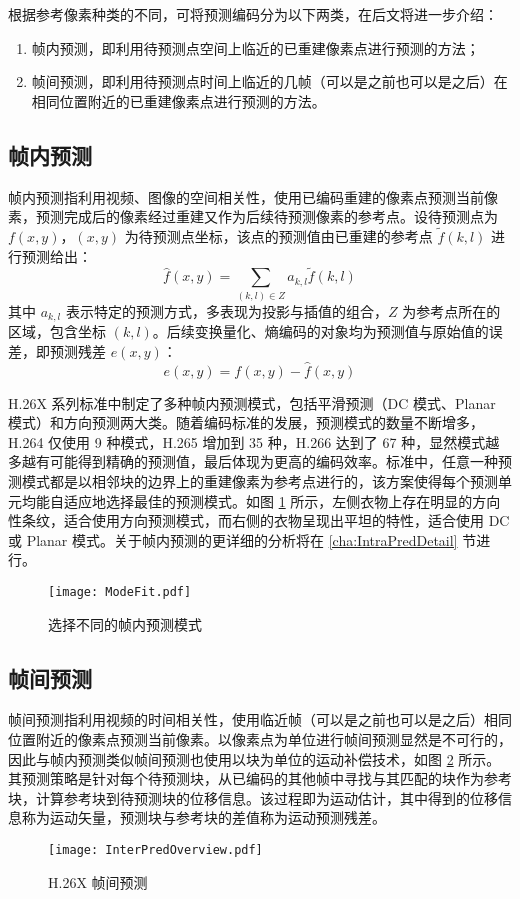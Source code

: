 根据参考像素种类的不同，可将预测编码分为以下两类，在后文将进一步介绍：
\begin{enumerate}
    \item 帧内预测，即利用待预测点空间上临近的已重建像素点进行预测的方法；
    \item 帧间预测，即利用待预测点时间上临近的几帧（可以是之前也可以是之后）在相同位置附近的已重建像素点进行预测的方法。
\end{enumerate}

\subsection{帧内预测}
帧内预测指利用视频、图像的空间相关性，使用已编码重建的像素点预测当前像素，预测完成后的像素经过重建又作为后续待预测像素的参考点。设待预测点为 $f(x,y)$，$(x,y)$ 为待预测点坐标，该点的预测值由已重建的参考点 $\widetilde{f}(k,l)$ 进行预测给出：
\begin{equation}
    \widehat{f}(x,y) = \sum_{(k,l)\in Z}a_{k,l}\widetilde{f}(k,l)
\end{equation}
其中 $a_{k,l}$ 表示特定的预测方式，多表现为投影与插值的组合，$Z$ 为参考点所在的区域，包含坐标 $(k,l)$。后续变换量化、熵编码的对象均为预测值与原始值的误差，即预测残差 $e(x,y)$：
\begin{equation}
    e(x,y) = f(x,y) - \widehat{f}(x,y) 
\end{equation}

H.26X 系列标准中制定了多种帧内预测模式，包括平滑预测（DC 模式、Planar 模式）和方向预测两大类。随着编码标准的发展，预测模式的数量不断增多，H.264 仅使用 9 种模式，H.265 增加到 35 种，H.266 达到了 67 种，显然模式越多越有可能得到精确的预测值，最后体现为更高的编码效率。标准中，任意一种预测模式都是以相邻块的边界上的重建像素为参考点进行的，该方案使得每个预测单元均能自适应地选择最佳的预测模式。如图 \ref{fig:ModeFit} 所示，左侧衣物上存在明显的方向性条纹，适合使用方向预测模式，而右侧的衣物呈现出平坦的特性，适合使用 DC 或 Planar 模式。关于帧内预测的更详细的分析将在 \ref{cha:IntraPredDetail} 节进行。
\begin{figure}[htb]
    \centering
    \texttt{[image: ModeFit.pdf]}
    \caption{选择不同的帧内预测模式}
    \label{fig:ModeFit}
\end{figure}

\subsection{帧间预测}
帧间预测指利用视频的时间相关性，使用临近帧（可以是之前也可以是之后）相同位置附近的像素点预测当前像素。以像素点为单位进行帧间预测显然是不可行的，因此与帧内预测类似帧间预测也使用以块为单位的运动补偿技术，如图 \ref{fig:InterPredOverview} 所示。其预测策略是针对每个待预测块，从已编码的其他帧中寻找与其匹配的块作为参考块，计算参考块到待预测块的位移信息。该过程即为运动估计，其中得到的位移信息称为运动矢量，预测块与参考块的差值称为运动预测残差。
\begin{figure}[htb]
    \centering
    \texttt{[image: InterPredOverview.pdf]}
    \caption{H.26X 帧间预测}
    \label{fig:InterPredOverview}
\end{figure}

